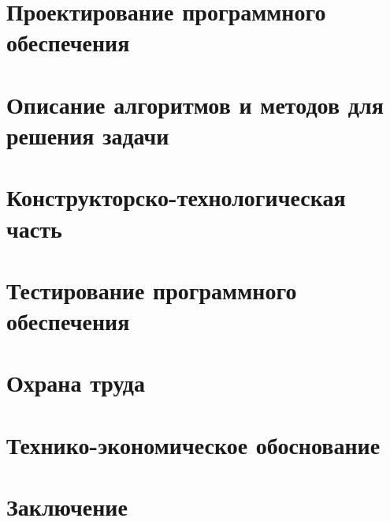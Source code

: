 






\newpage
{}
\renewcommand\contentsname{\hfill Содержание \hfill}
\tableofcontents

\newpage
\section{Проектирование программного обеспечения}
\setcounter{figure}{0}

\newpage
\section{Описание алгоритмов и методов для решения задачи}
\setcounter{figure}{0}

\newpage
\section{Конструкторско-технологическая часть}
\setcounter{figure}{0}

\newpage
\section{Тестирование программного обеспечения}
\setcounter{figure}{0}

\newpage
\section{Охрана труда}
\setcounter{figure}{0}

\newpage
\section{Технико-экономическое обоснование}
\setcounter{figure}{0}

\newpage
\section{Заключение}
\setcounter{figure}{0}

\newpage
\renewcommand{\refname}{Список использованных источников}

%
